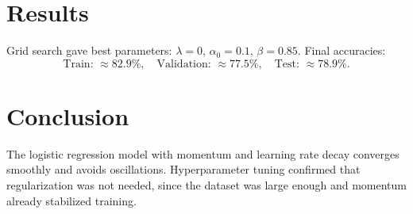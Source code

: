 \documentclass[12pt]{article}
\begin{document}
\section{Results}
Grid search gave best parameters: $\lambda=0$, $\alpha_0=0.1$, $\beta=0.85$.  
Final accuracies:
\[
\text{Train: } \approx 82.9\%, \quad 
\text{Validation: } \approx 77.5\%, \quad 
\text{Test: } \approx 78.9\%.
\]

\section{Conclusion}
The logistic regression model with momentum and learning rate decay converges smoothly and avoids oscillations.  
Hyperparameter tuning confirmed that regularization was not needed, since the dataset was large enough and momentum already stabilized training.
\end{document}
